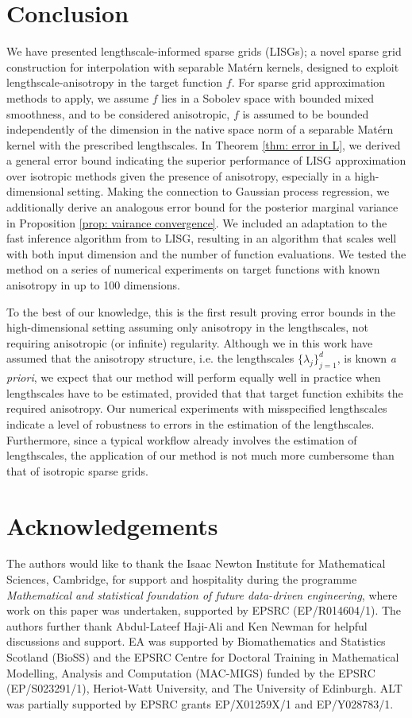 \documentclass[pdflatex,sn-mathphys-num]{sn-jnl}%
\theoremstyle{thmstyleone}%
\theoremstyle{thmstyletwo}%
\theoremstyle{thmstylethree}%
\begin{document}
\section{Conclusion}
We have presented lengthscale-informed sparse grids (LISGs); a novel sparse grid construction for interpolation with separable Mat\'ern kernels, 
designed to exploit lengthscale-anisotropy in the target function \(f\). For sparse grid approximation methods to apply, we assume \(f\) lies in a Sobolev space with bounded mixed smoothness, and to be considered anisotropic, \(f\) is assumed to be bounded independently of the dimension in the native space norm of a separable Mat\'ern kernel with the prescribed lengthscales. In Theorem \ref{thm: error in L}, we derived a general error bound indicating the superior performance of LISG approximation over isotropic methods given the presence of anisotropy, especially in a high-dimensional setting. Making the connection to Gaussian process regression, we additionally derive an analogous error bound for the posterior marginal variance in Proposition \ref{prop: vairance convergence}. We included an adaptation to the fast inference algorithm from \cite{Plumlee2014} to LISG, resulting in an algorithm that scales well with both input dimension and the number of function evaluations. We tested the method on a series of numerical experiments on target functions with known anisotropy in up to 100 dimensions.

To the best of our knowledge, this is the first result proving error bounds in the high-dimensional setting assuming
only anisotropy in the lengthscales, not requiring anisotropic (or infinite) regularity. Although we in this work have assumed that the anisotropy structure, i.e. the lengthscales $\{\lambda_j\}_{j=1}^d$, is known \emph{a priori}, we expect that our method will perform equally well in practice when lengthscales have to be estimated, provided that that target function exhibits the required anisotropy. Our numerical experiments with misspecified lengthscales indicate a level of robustness to errors in the estimation of the lengthscales. Furthermore, since a typical workflow already involves the estimation of lengthscales, the application of our method is not much more cumbersome than that of isotropic sparse grids.

\section*{Acknowledgements}
The authors would like to thank the Isaac Newton Institute for Mathematical Sciences, Cambridge, for support and hospitality during the programme \emph{Mathematical and statistical foundation of future data-driven engineering}, where work on this paper was undertaken, supported by EPSRC (EP/R014604/1). The authors further thank Abdul-Lateef Haji-Ali and Ken Newman for helpful discussions and support. EA was supported by Biomathematics and Statistics Scotland (BioSS) and the EPSRC Centre for Doctoral Training in Mathematical Modelling, Analysis and Computation (MAC-MIGS) funded by the EPSRC (EP/S023291/1), Heriot-Watt University, and The University of Edinburgh. ALT was partially supported by
EPSRC grants EP/X01259X/1 and EP/Y028783/1.
\end{document}
